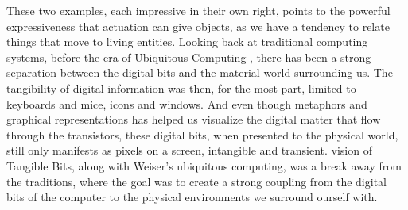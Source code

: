 These two examples, each impressive in their own right, points to the powerful expressiveness that actuation can give objects, as we have a tendency to relate things that move to living entities. 
\blank  
Looking back at traditional computing systems, before the era of Ubiquitous Computing \citep{weiser1991computer}, there has been a strong separation between the digital bits and the material world surrounding us.
The tangibility of digital information was then, for the most part, limited to keyboards and mice, icons and windows. 
And even though metaphors and graphical representations has helped us visualize the digital matter that flow through the transistors, these digital bits, when presented to the physical world, still only manifests as pixels on a screen, intangible and transient. 
\citet{ishii1997tangible} vision of Tangible Bits, along with Weiser's ubiquitous computing, was a break away from the traditions, where the goal was to create a strong coupling from the digital bits of the computer to the physical environments we surround ourself with.

